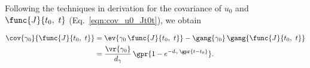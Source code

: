 Following the techniques in derivation for the covariance of $u_0$ and $\func{J}{t_0,\ t}$ (Eq.~\ref{eqn:cov_u0_Jt0t}), we obtain

\begin{align}
	\cov{\gamma_0}{\func{J}{t_0,\ t}} &= \ev{\gamma_0\,\func{J}{t_0,\ t}} - \gang{\gamma_0}\,\gang{\func{J}{t_0,\ t}} \nonumber \\
		&= \frac{\vr{\gamma_0}}{d_{\gamma}}\,\gpr{1 - e^{-d_{\gamma}\,\gpr{t - t_0}}}. \label{eqn:cov_gamma0_Jt0t}
\end{align}